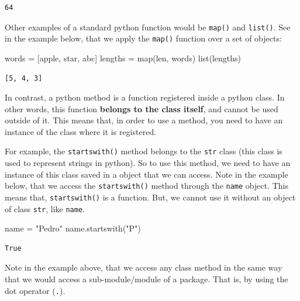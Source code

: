 \documentclass[
  11pt,
  letterpaper,
  DIV=11,
  numbers=noendperiod]{scrreprt}
\newenvironment{Shaded}{\begin{snugshade}}{\end{snugshade}}
\newcommand{\BuiltInTok}[1]{\textcolor[rgb]{0.00,0.23,0.31}{#1}}
\newcommand{\NormalTok}[1]{\textcolor[rgb]{0.00,0.23,0.31}{#1}}
\newcommand{\OperatorTok}[1]{\textcolor[rgb]{0.37,0.37,0.37}{#1}}
\newcommand{\StringTok}[1]{\textcolor[rgb]{0.13,0.47,0.30}{#1}}
\begin{document}
\begin{verbatim}
64
\end{verbatim}

Other examples of a standard python function would be \texttt{map()} and
\texttt{list()}. See in the example below, that we apply the
\texttt{map()} function over a set of objects:

\begin{Shaded}
\begin{Highlighting}[]
\NormalTok{words }\OperatorTok{=}\NormalTok{ [}\StringTok{\textquotesingle{}apple\textquotesingle{}}\NormalTok{, }\StringTok{\textquotesingle{}star\textquotesingle{}}\NormalTok{, }\StringTok{\textquotesingle{}abc\textquotesingle{}}\NormalTok{]}
\NormalTok{lengths }\OperatorTok{=} \BuiltInTok{map}\NormalTok{(}\BuiltInTok{len}\NormalTok{, words)}
\BuiltInTok{list}\NormalTok{(lengths)}
\end{Highlighting}
\end{Shaded}

\begin{verbatim}
[5, 4, 3]
\end{verbatim}

In contrast, a python method is a function registered inside a python
class. In other words, this function \textbf{belongs to the class
itself}, and cannot be used outside of it. This means that, in order to
use a method, you need to have an instance of the class where it is
registered.

For example, the \texttt{startswith()} method belongs to the
\texttt{str} class (this class is used to represent strings in python).
So to use this method, we need to have an instance of this class saved
in a object that we can access. Note in the example below, that we
access the \texttt{startswith()} method through the \texttt{name}
object. This means that, \texttt{startswith()} is a function. But, we
cannot use it without an object of class \texttt{str}, like
\texttt{name}.

\begin{Shaded}
\begin{Highlighting}[]
\NormalTok{name }\OperatorTok{=} \StringTok{"Pedro"}
\NormalTok{name.startswith(}\StringTok{"P"}\NormalTok{)}
\end{Highlighting}
\end{Shaded}

\begin{verbatim}
True
\end{verbatim}

Note in the example above, that we access any class method in the same
way that we would access a sub-module/module of a package. That is, by
using the dot operator (\texttt{.}).
\end{document}

